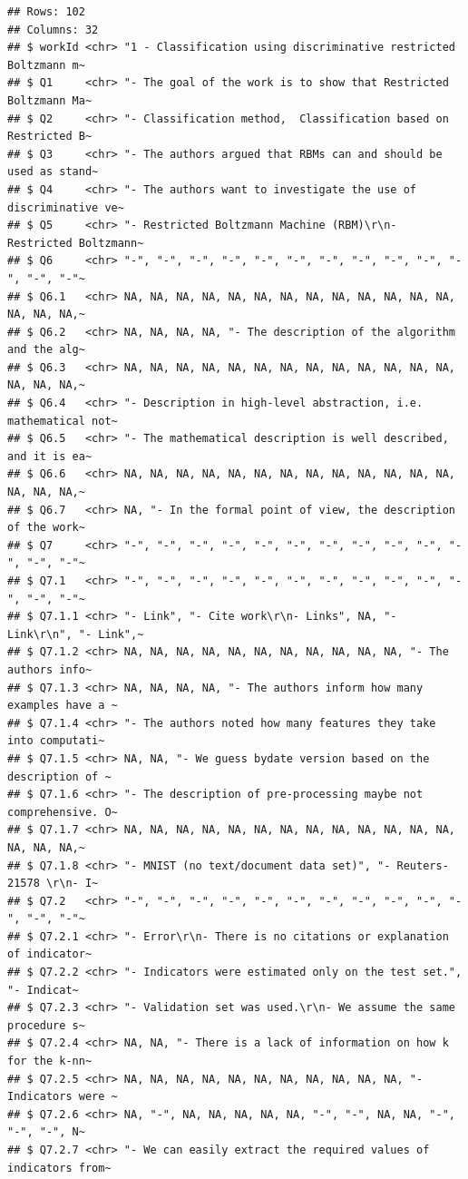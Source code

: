 \documentclass[
]{article}
\begin{document}
\begin{verbatim}
## Rows: 102
## Columns: 32
## $ workId <chr> "1 - Classification using discriminative restricted Boltzmann m~
## $ Q1     <chr> "- The goal of the work is to show that Restricted Boltzmann Ma~
## $ Q2     <chr> "- Classification method,  Classification based on Restricted B~
## $ Q3     <chr> "- The authors argued that RBMs can and should be used as stand~
## $ Q4     <chr> "- The authors want to investigate the use of discriminative ve~
## $ Q5     <chr> "- Restricted Boltzmann Machine (RBM)\r\n- Restricted Boltzmann~
## $ Q6     <chr> "-", "-", "-", "-", "-", "-", "-", "-", "-", "-", "-", "-", "-"~
## $ Q6.1   <chr> NA, NA, NA, NA, NA, NA, NA, NA, NA, NA, NA, NA, NA, NA, NA, NA,~
## $ Q6.2   <chr> NA, NA, NA, NA, "- The description of the algorithm and the alg~
## $ Q6.3   <chr> NA, NA, NA, NA, NA, NA, NA, NA, NA, NA, NA, NA, NA, NA, NA, NA,~
## $ Q6.4   <chr> "- Description in high-level abstraction, i.e. mathematical not~
## $ Q6.5   <chr> "- The mathematical description is well described, and it is ea~
## $ Q6.6   <chr> NA, NA, NA, NA, NA, NA, NA, NA, NA, NA, NA, NA, NA, NA, NA, NA,~
## $ Q6.7   <chr> NA, "- In the formal point of view, the description of the work~
## $ Q7     <chr> "-", "-", "-", "-", "-", "-", "-", "-", "-", "-", "-", "-", "-"~
## $ Q7.1   <chr> "-", "-", "-", "-", "-", "-", "-", "-", "-", "-", "-", "-", "-"~
## $ Q7.1.1 <chr> "- Link", "- Cite work\r\n- Links", NA, "- Link\r\n", "- Link",~
## $ Q7.1.2 <chr> NA, NA, NA, NA, NA, NA, NA, NA, NA, NA, NA, "- The authors info~
## $ Q7.1.3 <chr> NA, NA, NA, NA, "- The authors inform how many examples have a ~
## $ Q7.1.4 <chr> "- The authors noted how many features they take into computati~
## $ Q7.1.5 <chr> NA, NA, "- We guess bydate version based on the description of ~
## $ Q7.1.6 <chr> "- The description of pre-processing maybe not comprehensive. O~
## $ Q7.1.7 <chr> NA, NA, NA, NA, NA, NA, NA, NA, NA, NA, NA, NA, NA, NA, NA, NA,~
## $ Q7.1.8 <chr> "- MNIST (no text/document data set)", "- Reuters-21578 \r\n- I~
## $ Q7.2   <chr> "-", "-", "-", "-", "-", "-", "-", "-", "-", "-", "-", "-", "-"~
## $ Q7.2.1 <chr> "- Error\r\n- There is no citations or explanation of indicator~
## $ Q7.2.2 <chr> "- Indicators were estimated only on the test set.", "- Indicat~
## $ Q7.2.3 <chr> "- Validation set was used.\r\n- We assume the same procedure s~
## $ Q7.2.4 <chr> NA, NA, "- There is a lack of information on how k for the k-nn~
## $ Q7.2.5 <chr> NA, NA, NA, NA, NA, NA, NA, NA, NA, NA, NA, "- Indicators were ~
## $ Q7.2.6 <chr> NA, "-", NA, NA, NA, NA, NA, "-", "-", NA, NA, "-", "-", "-", N~
## $ Q7.2.7 <chr> "- We can easily extract the required values of indicators from~
\end{verbatim}
\end{document}
